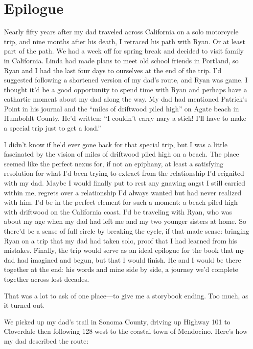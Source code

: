 \documentclass[12pt]{book}
\begin{document}
\renewcommand{\thechapter}{Epilogue} 
\renewcommand{\chaptername}{\ignorespaces}
\chapter*{Epilogue} \chaptermark{}

Nearly fifty years after my dad traveled across California on a solo motorcycle trip, and nine months after his death, I retraced his path with Ryan. Or at least part of the path. We had a week off for spring break and decided to visit family in California. Linda had made plans to meet old school friends in Portland, so Ryan and I had the last four days to ourselves at the end of the trip. I'd suggested following a shortened version of my dad's route, and Ryan was game. I thought it'd be a good opportunity to spend time with Ryan and perhaps have a cathartic moment about my dad along the way. My dad had mentioned Patrick's Point in his journal and the ``miles of driftwood piled high'' on Agate beach in Humboldt County. He'd written: ``I couldn't carry nary a stick! I'll have to make a special trip just to get a load.''

I didn't know if he'd ever gone back for that special trip, but I was a little fascinated by the vision of miles of driftwood piled high on a beach. The place seemed like the perfect nexus for, if not an epiphany, at least a satisfying resolution for what I'd been trying to extract from the relationship I'd reignited with my dad. Maybe I would finally put to rest any gnawing angst I still carried within me, regrets over a relationship I'd always wanted but had never realized with him. I'd be in the perfect element for such a moment: a beach piled high with driftwood on the California coast. I'd be traveling with Ryan, who was about my age when my dad had left me and my two younger sisters at home. So there'd be a sense of full circle by breaking the cycle, if that made sense: bringing Ryan on a trip that my dad had taken solo, proof that I had learned from his mistakes. Finally, the trip would serve as an ideal epilogue for the book that my dad had imagined and begun, but that I would finish. He and I would be there together at the end: his words and mine side by side, a journey we'd complete together across lost decades.

That was a lot to ask of one place---to give me a storybook ending. Too much, as it turned out.

We picked up my dad's trail in Sonoma County, driving up Highway 101 to Cloverdale then following 128 west to the coastal town of Mendocino. Here's how my dad described the route:
\end{document}
